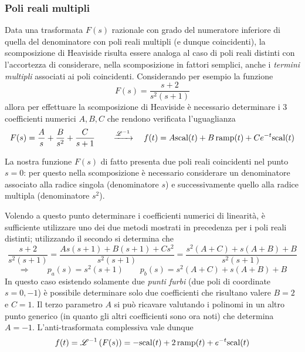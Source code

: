 		\subsubsection{Poli reali multipli}
			Data una trasformata $F(s)$ razionale con grado del numeratore inferiore di quella del denominatore con poli reali multipli (e dunque coincidenti), la scomposizione di Heaviside risulta essere analoga al caso di poli reali distinti con l'accortezza di considerare, nella scomposizione in fattori semplici, anche i \textit{termini multipli} associati ai poli coincidenti. Considerando per esempio la funzione
			\[ F(s) = \frac{s+2}{s^2(s+1)}\]
			allora per effettuare la scomposizione di Heaviside è necessario determinare i 3 coefficienti numerici $A,B,C$ che rendono verificata l'uguaglianza
			\[  F(s) = \frac A s + \frac{B}{s^2} + \frac{C}{s+1} \qquad \xrightarrow{\mathscr {L}^{-1}} \quad f(t) = A\textrm{scal}(t) + B\,\textrm{ramp}(t) + Ce^{-t}\textrm{scal}(t) \]
			\begin{nota}
				La nostra funzione $F(s)$ di fatto presenta due poli reali coincidenti nel punto $s=0$: per questo nella scomposizione è necessario considerare un denominatore associato alla radice singola (denominatore $s$) e successivamente quello alla radice multipla (denominatore $s^2$).
			\end{nota}
			
			Volendo a questo punto determinare i coefficienti numerici di linearità, è sufficiente utilizzare uno dei due metodi mostrati in precedenza per i poli reali distinti; utilizzando il secondo si determina che
			\[ \frac{s+2}{s^2(s+1)} = \frac{As (s+1)+ B(s+1) +Cs^2}{s^2(s+1)} = \frac{s^2(A+C) + s(A+B) + B}{s^2(s+1)} \]
			\[ \Rightarrow \qquad p_a (s) = s^2 (s+1) \qquad p_b(s) = s^2(A+C) + s(A+B) + B \]
			In questo caso esistendo solamente due \textit{punti furbi} (due poli di coordinate $s = 0,-1$) è possibile determinare solo due coefficienti che risultano valere $B=2$ e $C=1$. Il terzo parametro $A$ si può ricavare valutando i polinomi in un altro punto generico (in quanto gli altri coefficienti sono ora noti) che determina  $ A = -1$. L'anti-trasformata complessiva vale dunque
			\[ f(t) = \mathscr {L}^{-1} \left( F(s) \right) = -\textrm{scal}(t) + 2\,\textrm{ramp}(t) + e^{-t}\textrm{scal}(t) \]
			
